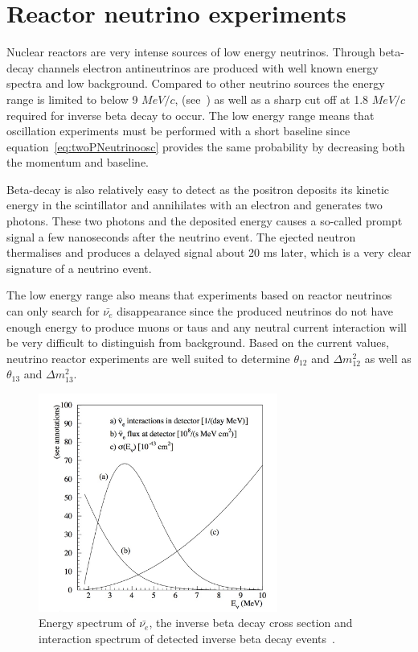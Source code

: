 \pagebreak
\newpage
\FloatBarrier
\section{Reactor neutrino experiments}
Nuclear reactors are very intense sources of low energy neutrinos. Through beta-decay channels electron antineutrinos are produced with well known energy spectra and low background. Compared to other neutrino sources the energy range is limited to below 9 $MeV/c$, (see~) as well as a sharp cut off at 1.8 $MeV/c$ required for inverse beta decay to occur. The low energy range means that oscillation experiments must be performed with a short baseline since equation~\ref{eq:twoPNeutrinoosc} provides the same probability by decreasing both the momentum and baseline.

Beta-decay is also relatively easy to detect as the positron deposits its kinetic energy in the scintillator and annihilates with an electron and generates two photons. These two photons and the deposited energy causes a so-called prompt signal a few nanoseconds after the neutrino event. The ejected neutron thermalises and produces a delayed signal about 20 ms later, which is a very clear signature of a neutrino event. 

The low energy range also means that experiments based on reactor neutrinos can only search for $\bar{\nu_e}$ disappearance since the produced neutrinos do not have enough energy to produce muons or taus and any neutral current interaction will be very difficult to distinguish from background. Based on the current values, neutrino reactor experiments are well suited to determine $\theta_{12}$ and $\Delta m_{12}^2 $ as well as  $\theta_{13}$ and $\Delta m_{13}^2$.

\begin{figure}[h!]
\centering
  \centering
\includegraphics[width=0.7\textwidth]{figures/reactor.jpeg}
\vspace{2mm}
\caption{Energy spectrum of $\bar{\nu_e}$, the inverse beta decay cross section and interaction spectrum of detected inverse beta decay events~\cite{65Reactor}.}
\label{fig:reactor}
\end{figure}


